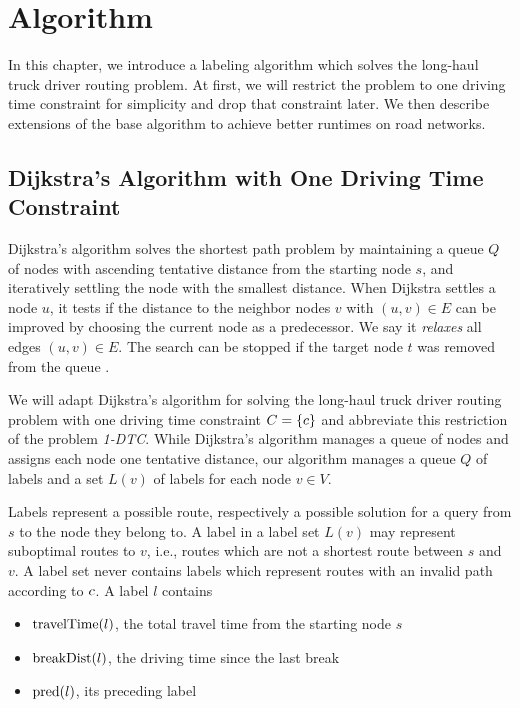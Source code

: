 
\chapter{Algorithm}
\label{ch:Algorithm}
In this chapter, we introduce a labeling algorithm which solves the long-haul truck driver routing problem. At first, we will restrict the problem to one driving time constraint for simplicity and drop that constraint later. We then describe extensions of the base algorithm to achieve better runtimes on road networks.

\section{Dijkstra's Algorithm with One Driving Time Constraint\label{sec:dijkstra_csp}}
Dijkstra's algorithm solves the shortest path problem by maintaining a queue $Q$ of nodes with ascending tentative distance from the starting node $s$, and iteratively settling the node with the smallest distance. When Dijkstra settles a node $u$, it tests if the distance to the neighbor nodes $v$ with $(u,v) \in E$ can be improved by choosing the current node as a predecessor. We say it \emph{relaxes} all edges $(u,v) \in E$. The search can be stopped if the target node $t$ was removed from the queue \cite{dijkstra:1959}.

We will adapt Dijkstra's algorithm for solving the long-haul truck driver routing problem with one driving time constraint $C = \{c\}$ and abbreviate this restriction of the problem \emph{1-DTC}. While Dijkstra's algorithm manages a queue of nodes and assigns each node one tentative distance, our algorithm manages a queue $Q$ of labels and a set $L(v)$ of labels for each node $v \in V$.

Labels represent a possible route, respectively a possible solution for a query from $s$ to the node they belong to. A label in a label set $L(v)$ may represent suboptimal routes to $v$, i.e., routes which are not a shortest route between $s$ and $v$. A label set never contains labels which represent routes with an invalid path according to $c$. A label $l$ contains

\begin{itemize}
	\item $\operatorname{travelTime}(l)$, the total travel time from the starting node $s$
	\item $\operatorname{breakDist}(l)$, the driving time since the last break
	\item $\operatorname{pred}(l)$, its preceding label
\end{itemize}

